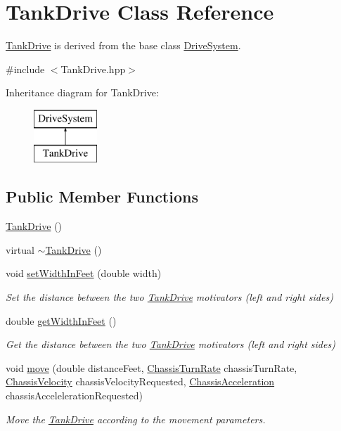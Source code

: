 \hypertarget{classTankDrive}{\section{Tank\-Drive Class Reference}
\label{classTankDrive}
}


\hyperlink{classTankDrive}{Tank\-Drive} is derived from the base class \hyperlink{classDriveSystem}{Drive\-System}.  




{\ttfamily \#include $<$Tank\-Drive.\-hpp$>$}

Inheritance diagram for Tank\-Drive\-:\begin{figure}[H]
\begin{center}
\leavevmode
\includegraphics[height=2.000000cm]{classTankDrive}
\end{center}
\end{figure}
\subsection*{Public Member Functions}
\begin{DoxyCompactItemize}
\item 
\hyperlink{classTankDrive_aa60aae817ddee667161e9fa4e65b164c}{Tank\-Drive} ()
\item 
virtual \hyperlink{classTankDrive_a56b6753b731ed996eee30da3e0d44055}{$\sim$\-Tank\-Drive} ()
\item 
void \hyperlink{classTankDrive_ab425ff9f2e12317fb45253da80886915}{set\-Width\-In\-Feet} (double width)
\begin{DoxyCompactList}\small\item\em Set the distance between the two \hyperlink{classTankDrive}{Tank\-Drive} motivators (left and right sides) \end{DoxyCompactList}\item 
double \hyperlink{classTankDrive_a1d755a00437ccfa2e5e12634f473ac30}{get\-Width\-In\-Feet} ()
\begin{DoxyCompactList}\small\item\em Get the distance between the two \hyperlink{classTankDrive}{Tank\-Drive} motivators (left and right sides) \end{DoxyCompactList}\item 
void \hyperlink{classTankDrive_ab4f103bfd11ab28c18ef292a505c454e}{move} (double distance\-Feet, \hyperlink{classChassisTurnRate}{Chassis\-Turn\-Rate} chassis\-Turn\-Rate, \hyperlink{classChassisVelocity}{Chassis\-Velocity} chassis\-Velocity\-Requested, \hyperlink{classChassisAcceleration}{Chassis\-Acceleration} chassis\-Acceleleration\-Requested)
\begin{DoxyCompactList}\small\item\em Move the \hyperlink{classTankDrive}{Tank\-Drive} according to the movement parameters. \end{DoxyCompactList}\end{DoxyCompactItemize}
